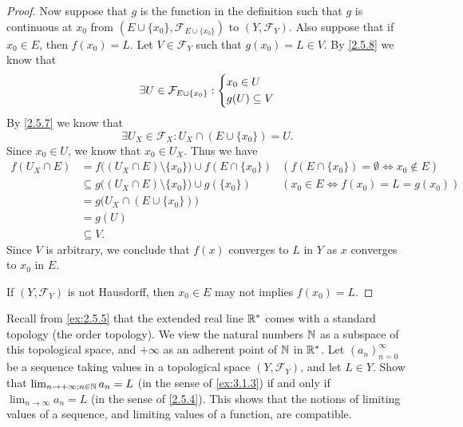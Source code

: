 \begin{proof}
  Now suppose that \(g\) is the function in the definition such that \(g\) is continuous at \(x_0\) from \((E \cup \{x_0\}, \mathcal{F}_{E \cup \{x_0\}})\) to \((Y, \mathcal{F}_Y)\).
  Also suppose that if \(x_0 \in E\), then \(f(x_0) = L\).
  Let \(V \in \mathcal{F}_Y\) such that \(g(x_0) = L \in V\).
  By \cref{2.5.8} we know that
  \[
    \exists U \in \mathcal{F}_{E \cup \{x_0\}} : \begin{dcases}
      x_0 \in U \\
      g(U) \subseteq V
    \end{dcases}
  \]
  By \cref{2.5.7} we know that
  \[
    \exists U_X \in \mathcal{F}_X : U_X \cap (E \cup \{x_0\}) = U.
  \]
  Since \(x_0 \in U\), we know that \(x_0 \in U_X\).
  Thus we have
  \begin{align*}
    f(U_X \cap E) & = f\big((U_X \cap E) \setminus \{x_0\}\big) \cup f(E \cap \{x_0\})  & (f(E \cap \{x_0\}) = \emptyset \iff x_0 \notin E) \\
                  & \subseteq g\big((U_X \cap E) \setminus \{x_0\}\big) \cup g(\{x_0\}) & (x_0 \in E \iff f(x_0) = L = g(x_0))              \\
                  & = g\big(U_X \cap (E \cup \{x_0\})\big)                                                                                  \\
                  & = g(U)                                                                                                                  \\
                  & \subseteq V.
  \end{align*}
  Since \(V\) is arbitrary, we conclude that \(f(x)\) converges to \(L\) in \(Y\) as \(x\) converges to \(x_0\) in \(E\).

  If \((Y, \mathcal{F}_Y)\) is not Hausdorff, then \(x_0 \in E\) may not implies \(f(x_0) = L\).
\end{proof}

\begin{ex}\label{ex:3.1.4}
  Recall from \cref{ex:2.5.5} that the extended real line \(\mathbb{R}^*\) comes with a standard topology (the order topology).
  We view the natural numbers \(\mathbb{N}\) as a subspace of this topological space, and \(+\infty\) as an adherent point of \(\mathbb{N}\) in \(\mathbb{R}^*\).
  Let \((a_n)_{n = 0}^\infty\) be a sequence taking values in a topological space \((Y, \mathcal{F}_Y)\), and let \(L \in Y\).
  Show that \(\lim_{n \to +\infty ; n \in \mathbb{N}} a_n = L\) (in the sense of \cref{ex:3.1.3}) if and only if \(\lim_{n \to \infty} a_n = L\) (in the sense of \cref{2.5.4}).
  This shows that the notions of limiting values of a sequence, and limiting values of a function, are compatible.
\end{ex}

